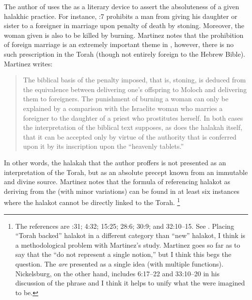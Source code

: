 The author of \jub uses the \HT as a literary device to assert the absoluteness of a given halakhic practice. For instance, :7 prohibits a man from giving his daughter or sister to a foreigner in marriage upon penalty of death by stoning. Moreover, the woman given is also to be killed by burning. Martinez notes that the prohibition of foreign marriage is an extremely important theme in \jub, however, there is no such prescription in the Torah (though not entirely foreign to the Hebrew Bible). Martinez writes:
\begin{quote}
    The biblical basis of the penalty imposed, that is, stoning, is deduced from the equivalence between delivering one's offspring to Moloch and delivering them to foreigners. The punishment of burning a woman can only be explained by a comparison with the Israelite woman who marries a foreigner to the daughter of a priest who prostitutes herself. In both cases the interpretation of the biblical text supposes, as does the halakah itself, that it can be accepted only by virtue of the authority that is conferred upon it by its inscription upon the ``heavenly tablets.''\autocite[67]{martinez_najman-tigchelaar2012}
\end{quote}
\noindent
In other words, the halakah that the author proffers is not presented as an interpretation of the Torah, but as an absolute precept known from an immutable and divine source. Martinez notes that the formula of referencing halakot as deriving from the \HT (with minor variations) can be found in at least six instances where the halakot cannot be directly linked to the Torah.%
    \footnote{The references are :31; 4:32; 15:25; 28:6; 30:9; and 32:10--15. See \cite[64--68]{martinez_najman-tigchelaar2012}. Placing ``Torah backed'' halakot in a different category than ``new'' halakot, I think is a methodological problem with Martinez's study. Martinez goes so far as to say that the \HT ``do not represent a single notion,'' but I think this begs the question. The \HT \emph{are} presented as a single idea (with multiple functions). Nickelsburg, on the other hand, includes 6:17--22 and 33:10--20 in his discussion of the phrase and I think it helps to unify what the \HT were imagined to be.}

